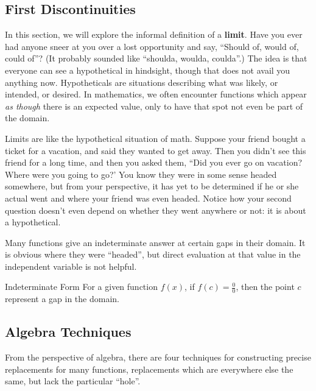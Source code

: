 
\subsection{First Discontinuities}


In this section, we will explore the informal definition of a \textbf{limit}.  Have you ever had anyone
sneer at you over a lost opportunity and say, ``Should of, would of, could of''?  (It probably
sounded like ``shoulda, woulda, coulda''.)  The idea is that everyone can see a hypothetical 
in hindsight, though that does not avail you anything now.  Hypotheticals are situations describing
what was likely, or intended, or desired.  In mathematics, we often encounter functions
which appear \textit{as though} there is an expected value, only to have that spot not
even be part of the domain.

Limits are like the hypothetical situation of math.  Suppose your friend bought a ticket for a vacation,
and said they wanted to get away.  Then you didn't see this friend for a long time, and then you asked
them, ``Did you ever go on vacation?  Where were you going to go?'  You know they 
were in some sense headed somewhere, but from your perspective, it has yet to be determined if
he or she actual went and where your friend was even headed.  Notice how your second question
doesn't even depend on whether they went anywhere or not: it is about a hypothetical.  

Many functions give an indeterminate answer at certain gaps in their domain.  It is obvious
where they were ``headed'', but direct evaluation at that value in the independent variable is
not helpful.



\begin{derivation}{Indeterminate Form}
For a given function $f(x)$, if $f(c)=\frac{0}{0}$, then the point $c$ represent a gap in the domain.
\end{derivation}


\subsection{Algebra Techniques}
From the perspective of algebra, there are four techniques for constructing 
precise replacements for many functions, replacements which are everywhere else the same,
but lack the particular ``hole''.

